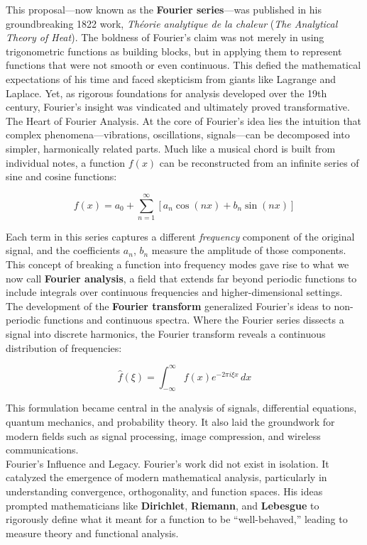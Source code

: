 \documentclass{book}
\begin{document}
This proposal---now known as the \textbf{Fourier series}---was published in his groundbreaking 1822 work, \emph{Théorie analytique de la chaleur} (\emph{The Analytical Theory of Heat}). The boldness of Fourier’s claim was not merely in using trigonometric functions as building blocks, but in applying them to represent functions that were not smooth or even continuous. This defied the mathematical expectations of his time and faced skepticism from giants like Lagrange and Laplace. Yet, as rigorous foundations for analysis developed over the 19th century, Fourier’s insight was vindicated and ultimately proved transformative.\\

The Heart of Fourier Analysis. At the core of Fourier’s idea lies the intuition that complex phenomena---vibrations, oscillations, signals---can be decomposed into simpler, harmonically related parts. Much like a musical chord is built from individual notes, a function $f(x)$ can be reconstructed from an infinite series of sine and cosine functions:

\[
f(x) = a_0 + \sum_{n=1}^{\infty} \left[ a_n \cos(nx) + b_n \sin(nx) \right]
\]

Each term in this series captures a different \emph{frequency} component of the original signal, and the coefficients $a_n$, $b_n$ measure the amplitude of those components. This concept of breaking a function into frequency modes gave rise to what we now call \textbf{Fourier analysis}, a field that extends far beyond periodic functions to include integrals over continuous frequencies and higher-dimensional settings.\\

The development of the \textbf{Fourier transform} generalized Fourier’s ideas to non-periodic functions and continuous spectra. Where the Fourier series dissects a signal into discrete harmonics, the Fourier transform reveals a continuous distribution of frequencies:

\[
\hat{f}(\xi) = \int_{-\infty}^{\infty} f(x) e^{-2\pi i \xi x} \, dx
\]

This formulation became central in the analysis of signals, differential equations, quantum mechanics, and probability theory. It also laid the groundwork for modern fields such as signal processing, image compression, and wireless communications.\\

Fourier’s Influence and Legacy. Fourier’s work did not exist in isolation. It catalyzed the emergence of modern mathematical analysis, particularly in understanding convergence, orthogonality, and function spaces. His ideas prompted mathematicians like \textbf{Dirichlet}, \textbf{Riemann}, and \textbf{Lebesgue} to rigorously define what it meant for a function to be “well-behaved,” leading to measure theory and functional analysis.\\
\end{document}
